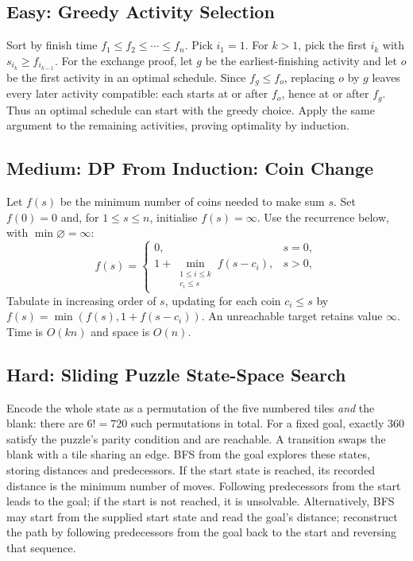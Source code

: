 \documentclass[12pt]{article}
\begin{document}
\subsection*{Easy: Greedy Activity Selection}
Sort by finish time $f_1\le f_2\le\cdots\le f_n$. Pick $i_1=1$. For
$k>1$, pick the first $i_k$ with $s_{i_k}\ge f_{i_{k-1}}$.
For the exchange proof, let $g$ be the earliest-finishing activity
and let $o$ be the first activity in an optimal schedule. Since
$f_g\le f_o$, replacing $o$ by $g$ leaves every later activity
compatible: each starts at or after $f_o$, hence at or after $f_g$.
Thus an optimal schedule can start with the greedy choice. Apply the
same argument to the remaining activities, proving optimality by
induction.

\subsection*{Medium: DP From Induction: Coin Change}
Let $f(s)$ be the minimum number of coins needed to make sum $s$.
Set $f(0)=0$ and, for $1\le s\le n$, initialise $f(s)=\infty$.
Use the recurrence below, with $\min\varnothing=\infty$:
\[
f(s)=
\begin{cases}
0,&s=0,\\[2mm]
1+\displaystyle\min_{\substack{1\le i\le k\\c_i\le s}}f(s-c_i),&s>0,
\end{cases}
\]
Tabulate in increasing order of
$s$, updating for each coin $c_i\le s$ by
$f(s)=\min(f(s),1+f(s-c_i))$. An unreachable target retains value
$\infty$. Time is $O(kn)$ and space is $O(n)$.

\subsection*{Hard: Sliding Puzzle State-Space Search}
Encode the whole state as a permutation of the five numbered tiles
\emph{and} the blank: there are $6!=720$ such permutations in total.
For a fixed goal, exactly 360 satisfy the puzzle's parity condition
and are reachable. A transition swaps the blank with a tile sharing
an edge. BFS from the goal explores these states, storing distances
and predecessors. If the start state is reached, its recorded
distance is the minimum number of moves. Following predecessors from
the start leads to the goal; if the start is not reached, it is
unsolvable. Alternatively, BFS may start from the supplied start
state and read the goal's distance; reconstruct the path by following
predecessors from the goal back to the start and reversing that
sequence.
\end{document}
